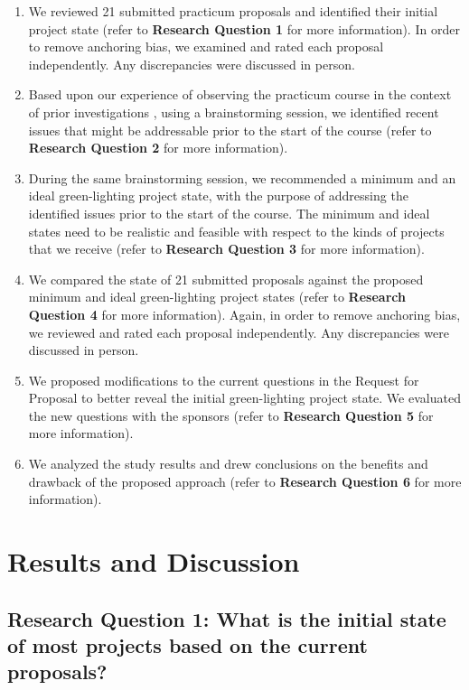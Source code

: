 \documentclass[conference]{IEEEtran}
\begin{document}
\begin{enumerate}
\itemsep1pt\parskip0pt
\item
  We reviewed 21 submitted practicum proposals and
  identified their initial project state (refer to \textbf{Research Question
  1} for more information). In order to remove anchoring bias, we examined
  and rated each proposal independently. Any discrepancies were
  discussed in person.
\item
  Based upon our experience of observing the practicum course in the
  context of prior investigations \cite{EASE2014, ICSE2014},
  using a brainstorming session, we identified recent issues that
  might be addressable prior to the start of the course (refer to
  \textbf{Research Question 2} for more information).
\item
  During the same brainstorming session, we recommended a minimum and
  an ideal green-lighting project state, with the purpose of addressing
  the identified issues prior to the start of the course. The minimum
  and ideal states need to be realistic and feasible with respect to the
  kinds of projects that we receive (refer to \textbf{Research Question
  3} for more information).
\item
  We compared the state of 21 submitted proposals against the proposed
  minimum and ideal green-lighting project states (refer to \textbf{Research
  Question 4} for more information). Again, in order to remove
  anchoring bias, we reviewed and rated each proposal independently. Any
  discrepancies were discussed in person.
\item
  We proposed modifications to the current questions in the Request for
  Proposal to better reveal the initial green-lighting project state. We
  evaluated the new questions with the sponsors (refer to \textbf{Research
  Question 5} for more information).
\item
  We analyzed the study results and drew conclusions on the benefits
  and drawback of the proposed approach (refer to \textbf{Research Question 6
  } for more information).
\end{enumerate}

\section{Results and Discussion}
\label{Results}

\subsection{Research Question 1: What is the initial
state of most projects based on the current proposals?}
\end{document}
